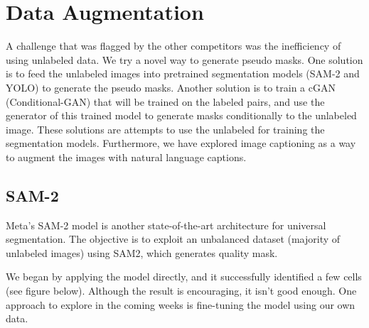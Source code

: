 \documentclass[]{article}
\begin{document}
\section{Data Augmentation}
A challenge that was flagged by the other competitors was the inefficiency of using unlabeled data. We try a novel way to generate pseudo masks. One solution is to feed the unlabeled images into pretrained segmentation models (SAM-2 and YOLO) to generate the pseudo masks. Another solution is to train a cGAN (Conditional-GAN) that will be trained on the labeled pairs, and use the generator of this trained model to generate masks conditionally to the unlabeled image. 
These solutions are attempts to use the unlabeled for training the segmentation models. Furthermore, we have explored image captioning as a way to augment the images with natural language captions.
\subsection{SAM-2}
Meta's SAM-2 model is another state-of-the-art architecture for universal segmentation. The objective is to exploit an unbalanced dataset (majority of unlabeled images) using SAM2, which generates quality mask.

We began by applying the model directly, and it successfully identified a few cells (see figure below). Although the result is encouraging, it isn't good enough. One approach to explore in the coming weeks is fine-tuning the model using our own data.
\end{document}
